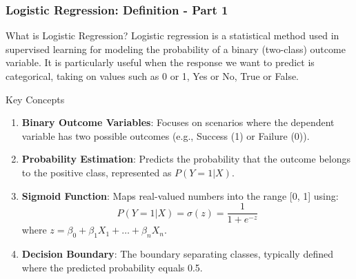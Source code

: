 \documentclass[aspectratio=169]{beamer}
\begin{document}
\begin{frame}[fragile]
    \frametitle{Logistic Regression: Definition - Part 1}
    \begin{block}{What is Logistic Regression?}
        Logistic regression is a statistical method used in supervised learning for modeling the probability of a binary (two-class) outcome variable. It is particularly useful when the response we want to predict is categorical, taking on values such as 0 or 1, Yes or No, True or False.
    \end{block}

    \begin{block}{Key Concepts}
        \begin{enumerate}
            \item \textbf{Binary Outcome Variables}: Focuses on scenarios where the dependent variable has two possible outcomes (e.g., Success (1) or Failure (0)).
            \item \textbf{Probability Estimation}: Predicts the probability that the outcome belongs to the positive class, represented as \( P(Y=1|X) \).
            \item \textbf{Sigmoid Function}: Maps real-valued numbers into the range [0, 1] using:
            \[
            P(Y=1|X) = \sigma(z) = \frac{1}{1 + e^{-z}}
            \]
            where \( z = \beta_0 + \beta_1X_1 + \ldots + \beta_nX_n \).
            \item \textbf{Decision Boundary}: The boundary separating classes, typically defined where the predicted probability equals 0.5.
        \end{enumerate}
    \end{block}
\end{frame}
\end{document}
